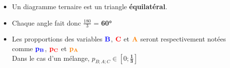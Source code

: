 \documentclass[10pt]{article}
\begin{document}
\vspace{.5cm}
\begin{minipage}{.43\textwidth}

        \begin{itemize}

        \item Un diagramme ternaire est un triangle \textbf{équilatéral}.\\[.25cm]

        \item Chaque angle fait donc $\frac{180}{3}$ = \textbf{60°}\\[.25cm]

        \item Les propportions des variables $\color{blue}\textbf{B}\color{black}$, $\color{red}\textbf{C}\color{black}$ et $\color{orange}\textbf{A}\color{black}$ seront respectivement notées comme $\color{blue}\mathbf{{p}_{B}}\color{black}$, $\color{red}\mathbf{{p}_{C}}$ et $\color{orange} \mathbf{{p}_{A}} \color{black}$ \\[.25cm]

        Dans le cas d'un mélange, $p_{B;A;C} \in [0;\mathbf{\frac{1}{3}}]$ \\[1cm]

        \end{itemize}

\end{minipage}%
\end{document}

